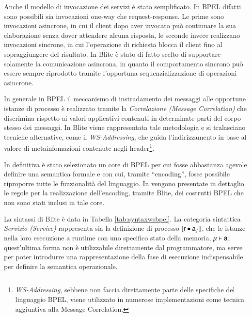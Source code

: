 Anche il modello di invocazione dei servizi è stato semplificato. In BPEL difatti
sono possibili sia invocazioni one-way che request-response. Le prime sono
invocazioni asincrone, in cui il client dopo aver invocato può continuare la sua
elaborazione senza dover attendere alcuna risposta, le seconde invece realizzano
invocazioni sincrone, in cui l'operazione di richiesta blocca il client fino al
sopraggiungere del risultato. In Blite è stato di fatto scelto di supportare
solamente la comunicazione asincrona, in quanto il comportamento sincrono può
essere sempre riprodotto tramite l'opportuna sequenzializzazione di operazioni
asincrone.

In generale in BPEL il meccanismo di instradamento dei messaggi alle opportune
istanze di processo è realizzato tramite la \emph{Correlazione (Message
Correlation)} che discrimina rispetto ai valori applicativi contenuti in determinate parti del
corpo stesso dei messaggi. In Blite viene rappresentata tale metodologia e si
tralasciano tecniche alternative, come il \emph{WS-Addressing}, che guida
l'indirizzamento in base al valore di metainfomazioni contenute negli
header\footnote{\emph{WS-Addressing}, sebbene non faccia direttamente parte
delle specifiche del linguaggio BPEL, viene utilizzato in numerose
implementazioni come tecnica aggiuntiva alla Message
Correlation.}.

In definitiva è stato selezionato un core di BPEL per cui fosse abbastanza
agevole definire una semantica formale e con cui, tramite ``encoding'', fosse
possibile riproporre tutte le funzionalità del linguaggio. In \cite{LaPuTie1}
vengono presentate in dettaglio le regole per la realizzazione dell'encoding,
tramite Blite, dei costrutti BPEL che non sono stati inclusi in tale core. 

La sintassi di Blite è data in Tabella \ref{tab:syntaxwsbpel}. La categoria
sintattica \emph{Servizio (Service)} rappresenta  sia la definizione di
processo $[{\sf r} \bullet {\sf a}_f]$, che le istanze nella loro esecuzione a runtime
con uno specifico stato della memoria, ${\sf \mu} \vdash {\sf a}$; quest'ultima
forma non è utilizzabile direttamente dal programmatore, ma serve per poter
introdurre una rappresentazione della fase di esecuzione indispensabile per
definire la semantica operazionale.

